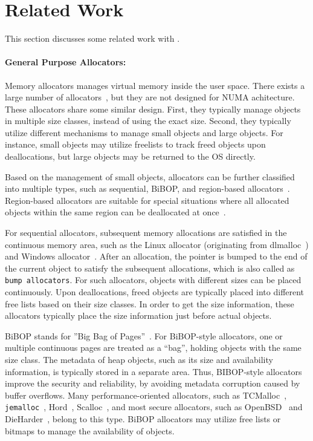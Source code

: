 \section{Related Work}

\label{sec:related}

This section discusses some related work with \NM{}. 

\paragraph{General Purpose Allocators:}
Memory allocators manages virtual memory inside the user space. There exists a large number of allocators~\cite{dlmalloc, Hoard, TCMalloc, jemalloc, Scalloc}, but they are not designed for NUMA achitecture.  These allocators share some similar design. First, they typically manage objects in multiple size classes, instead of using the exact size. Second, they typically utilize different mechanisms to manage small objects and large objects. For instance, small objects may utilize freelists to track freed objects upon deallocations, but large objects may be returned to the OS directly.  

Based on the management of small objects, allocators can be further classified into multiple types, such as sequential, BiBOP, and region-based allocators~\cite{DieHarder, Gay:1998:MME:277650.277748}. Region-based allocators are suitable for special situations where all allocated objects within the same region can be deallocated at once~\cite{Gay:1998:MME:277650.277748}. 

For sequential allocators, subsequent memory allocations are satisfied in the continuous memory area, such as the Linux allocator (originating from dlmalloc~\cite{dlmalloc}) and Windows allocator~\cite{DieHarder}. After an allocation, the pointer is bumped to the end of the current object to satisfy the subsequent allocations, which is also called as \texttt{bump allocators}. For such allocators, objects with different sizes can be placed continuously. Upon deallocations, freed objects are typically placed into different free lists based on their size classes. In order to get the size information, these allocators typically place the size information just before actual objects. 

BiBOP stands for ''Big Bag of Pages''~\cite{hanson1980}. For BiBOP-style allocators, one or multiple continuous pages are treated as a ``bag'', holding objects with the same size class. The metadata of heap objects, such as its size and availability information, is typically stored in a separate area. Thus, BIBOP-style allocators improve the security and reliability, by avoiding metadata corruption caused by buffer overflows. Many performance-oriented allocators, such as TCMalloc~\cite{TCMalloc}, \texttt{jemalloc}~\cite{jemalloc}, Hord~\cite{Hoard}, Scalloc~\cite{Scalloc}, and most secure allocators, such as OpenBSD~\cite{OpenBSD} and DieHarder~\cite{DieHarder}, belong to this type. BiBOP allocators may utilize free lists or bitmaps to manage the availability of objects. 


